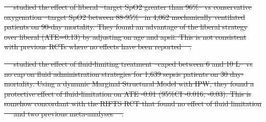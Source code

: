 \documentclass[10pt,letterpaper]{article}
\providecommand{\DIFdeltex}[1]{{\protect\color{red}\sout{#1}}}                      %
\providecommand{\DIFdelbegin}{} %
\providecommand{\DIFdelend}{} %
\providecommand{\DIFdel}[1]{\texorpdfstring{\DIFdeltex{#1}}{}} %
\newcommand{\DIFscaledelfig}{0.5}
\newlength{\DIFdelgraphicswidth} %
\newlength{\DIFdelgraphicsheight} %
\newcommand{\DIFdelincludegraphics}[2][]{%
\sbox{\DIFdelgraphicsbox}{\DIFOincludegraphics[#1]{#2}}%
\settoboxwidth{\DIFdelgraphicswidth}{\DIFdelgraphicsbox} %
\settoboxtotalheight{\DIFdelgraphicsheight}{\DIFdelgraphicsbox} %
\scalebox{\DIFscaledelfig}{%
\parbox[b]{\DIFdelgraphicswidth}{\usebox{\DIFdelgraphicsbox}\\[-\baselineskip] \rule{\DIFdelgraphicswidth}{0em}}\llap{\resizebox{\DIFdelgraphicswidth}{\DIFdelgraphicsheight}{%
\setlength{\unitlength}{\DIFdelgraphicswidth}%
\begin{picture}(1,1)%
\thicklines\linethickness{2pt} %
{\color[rgb]{1,0,0}\put(0,0){\framebox(1,1){}}}%
{\color[rgb]{1,0,0}\put(0,0){\line( 1,1){1}}}%
{\color[rgb]{1,0,0}\put(0,1){\line(1,-1){1}}}%
\end{picture}%
}\hspace*{3pt}}} %
} %
\DeclareRobustCommand{\DIFdelbegin}{\DIFOdelbegin \let\includegraphics\DIFdelincludegraphics} %
\DeclareRobustCommand{\DIFdelend}{\DIFOaddend \let\includegraphics\DIFOincludegraphics} %
\begin{document}
\DIFdelbegin %
\DIFdel{\mbox{%
\cite{gani2023structural} }\hskip0pt%
studied the effect of \textcolor{I}{liberal
          --target SpO2 greater than 96\%--} vs \textcolor{C}{conservative
          oxygenation --target SpO2 between 88-95\%--} in \textcolor{P}{4,062
          mechanically ventilated patients} on \textcolor{O}{90-day mortality}.
        They found an advantage of the liberal strategy over liberal
        (ATE=0.13) by adjusting on age and apsii. This is not consistent with
        previous RCTs where no effects have been reported \mbox{%
\cite{panwar2016conservative, mackle2019conservative}}\hskip0pt%
.
}\DIFdelend %

\DIFdelbegin %
\DIFdel{\mbox{%
\cite{shahn2020fluid} }\hskip0pt%
studied the effect of \textcolor{I}{fluid-limiting
          treatment --caped between 6 and 10 L--} vs \textcolor{C}{no cap on
          fluid administration} strategies for \textcolor{P}{1,639 sepsis
          patients} on \textcolor{O}{30 day-mortality}. Using a dynamic Marginal
        Structural Model with IPW, they found a protective effect of
        fluid-limitation on ATE -0.01 (95\%CI -0.016, -0.03). This is somehow
        concordant with the RIFTS RCT that found no effect of fluid limitation
        \mbox{%
\cite{corl2019restrictive} }\hskip0pt%
and two previous meta-analyses
        \mbox{%
\cite{malbrain2014fluid,meyhoff2020lower}}\hskip0pt%
.
}\DIFdelend %
\end{document}
